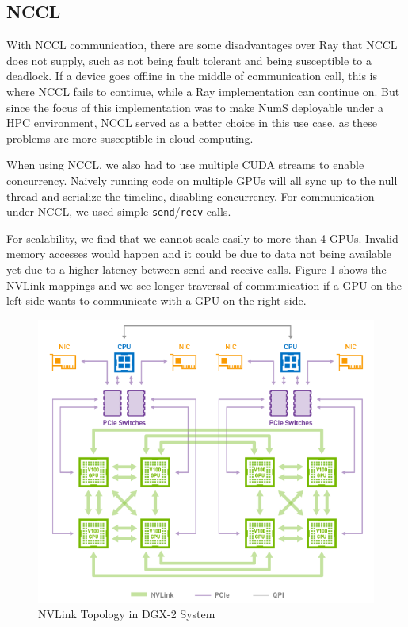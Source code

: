 \documentclass{article}
\begin{document}
\subsection{NCCL}
With NCCL communication, there are some disadvantages over Ray that NCCL does not supply, such as not being fault tolerant and being susceptible to a deadlock. If a device goes offline in the middle of communication call, this is where NCCL fails to continue, while a Ray implementation can continue on. But since the focus of this implementation was to make NumS deployable under a HPC environment, NCCL served as a better choice in this use case, as these problems are more susceptible in cloud computing.

When using NCCL, we also had to use multiple CUDA streams to enable concurrency. Naively running code on multiple GPUs will all sync up to the null thread and serialize the timeline, disabling concurrency. For communication under NCCL, we used simple \verb|send|/\verb|recv| calls.

For scalability, we find that we cannot scale easily to more than 4 GPUs. Invalid memory accesses would happen and it could be due to data not being available yet due to a higher latency between send and receive calls. Figure \ref{fig:nvlink} shows the NVLink mappings and we see longer traversal of communication if a GPU on the left side wants to communicate with a GPU on the right side.

\begin{figure}
	\centerline{\includegraphics[width=5in]{figures/nvlink.png}}
	\caption{NVLink Topology in DGX-2 System}
	\label{fig:nvlink}
\end{figure}
\end{document}
